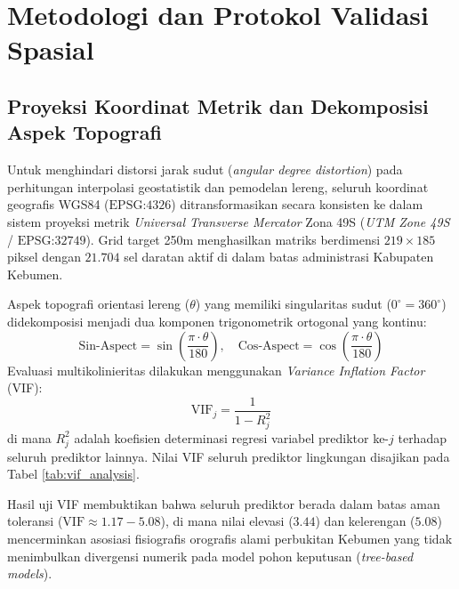 \documentclass[11pt,a4paper,titlepage]{article}
\begin{document}
\section{Metodologi dan Protokol Validasi Spasial}

\subsection{Proyeksi Koordinat Metrik dan Dekomposisi Aspek Topografi}
Untuk menghindari distorsi jarak sudut (\textit{angular degree distortion}) pada perhitungan interpolasi geostatistik dan pemodelan lereng, seluruh koordinat geografis WGS84 ($\text{EPSG:4326}$) ditransformasikan secara konsisten ke dalam sistem proyeksi metrik \textit{Universal Transverse Mercator} Zona 49S (\textit{UTM Zone 49S} / $\text{EPSG:32749}$). Grid target 250m menghasilkan matriks berdimensi $219 \times 185$ piksel dengan $21.704$ sel daratan aktif di dalam batas administrasi Kabupaten Kebumen.

Aspek topografi orientasi lereng ($\theta$) yang memiliki singularitas sudut ($0^\circ = 360^\circ$) didekomposisi menjadi dua komponen trigonometrik ortogonal yang kontinu:
\begin{equation}
    \text{Sin-Aspect} = \sin\left(\frac{\pi \cdot \theta}{180}\right), \quad \text{Cos-Aspect} = \cos\left(\frac{\pi \cdot \theta}{180}\right)
\end{equation}
Evaluasi multikolinieritas dilakukan menggunakan \textit{Variance Inflation Factor} (VIF):
\begin{equation}
    \text{VIF}_j = \frac{1}{1 - R_j^2}
\end{equation}
di mana $R_j^2$ adalah koefisien determinasi regresi variabel prediktor ke-$j$ terhadap seluruh prediktor lainnya. Nilai VIF seluruh prediktor lingkungan disajikan pada Tabel \ref{tab:vif_analysis}.



Hasil uji VIF membuktikan bahwa seluruh prediktor berada dalam batas aman toleransi ($\text{VIF} \approx 1.17 - 5.08$), di mana nilai elevasi ($3.44$) dan kelerengan ($5.08$) mencerminkan asosiasi fisiografis orografis alami perbukitan Kebumen yang tidak menimbulkan divergensi numerik pada model pohon keputusan (\textit{tree-based models}).
\end{document}
